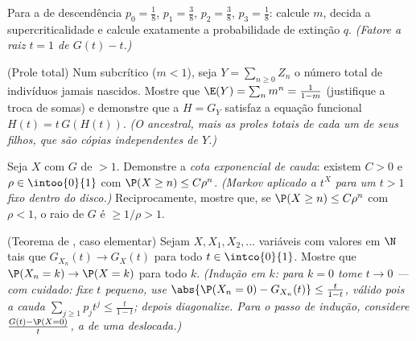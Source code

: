 \begin{exercise}[$\star\star$]\label{exo:b2:genfun:6}
Para a  de descendência $p_0 = \frac18$, $p_1 = \frac38$, $p_2 =
\frac38$, $p_3 = \frac18$: calcule $m$, decida a
supercriticalidade e calcule exatamente a probabilidade de extinção $q$.
\emph{(Fatore a raiz $t = 1$ de $G(t) - t$.)}
\end{exercise}

\begin{exercise}[$\star\star\star$]\label{exo:b2:genfun:7}
(Prole total) Num  subcrítico ($m < 1$), seja
$Y = \sum_{n\geq0} Z_n$ o número total de indivíduos jamais
nascidos. Mostre que $\E(Y) = \sum_n m^n = \frac{1}{1 - m}$ (justifique a
troca de somas) e demonstre que a 
$H = G_Y$ satisfaz a equação funcional $H(t) = t\,G(H(t))$.
\emph{(O ancestral, mais as proles totais de cada um de seus
filhos, que são cópias independentes de $Y$.)}
\end{exercise}

\begin{exercise}[$\star\star\star$]\label{exo:b2:genfun:8}
Seja $X$ com  $G$ de  $>
1$. Demonstre a \emph{cota exponencial de cauda}: existem $C > 0$ e
$\rho \in \intoo{0}{1}$ com $\P(X \geq n) \leq C\rho^n$.
\emph{(Markov aplicado a $t^X$ para um $t > 1$ fixo dentro do
disco.)} Reciprocamente, mostre que, se $\P(X \geq n) \leq C\rho^n$ com
$\rho < 1$, o raio de $G$ é $\geq 1/\rho > 1$.
\end{exercise}

\begin{exercise}[$\star\star\star$]\label{exo:b2:genfun:9}
(Teorema de , caso elementar) Sejam $X, X_1, X_2, \dots$
variáveis com valores em $\N$ tais que $G_{X_n}(t) \to G_X(t)$ para todo $t \in
\intco{0}{1}$. Mostre que $\P(X_n = k) \to \P(X = k)$ para todo
$k$. \emph{(Indução em $k$: para $k = 0$ tome $t \to 0$ ---
com cuidado: fixe $t$ pequeno, use $\abs{\P(X_n = 0) - G_{X_n}(t)}
\leq \frac{t}{1-t}$, válido pois a cauda $\sum_{j \geq 1}p_jt^j
\leq \frac{t}{1 - t}$; depois diagonalize. Para o passo de indução,
considere $\frac{G(t) - \P(X = 0)}{t}$, a  de
uma  deslocada.)}
\end{exercise}

